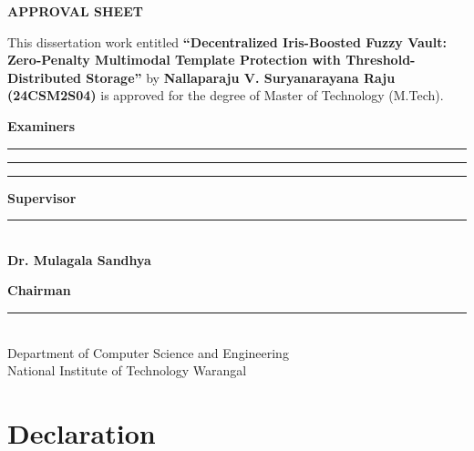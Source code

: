 \documentclass[a4paper,12pt,oneside]{book}
\begin{document}
\begin{titlepage}
\begin{center}

{\bfseries\fontsize{18}{20}\selectfont APPROVAL SHEET\par}

\vspace{1.3cm}

This dissertation work entitled {\bfseries ``Decentralized Iris-Boosted Fuzzy Vault: Zero-Penalty Multimodal Template Protection with Threshold-Distributed Storage''} by {\bfseries Nallaparaju V. Suryanarayana Raju (24CSM2S04)} is approved for the degree of Master of Technology (M.Tech).

\vspace{1.2cm}
{\bfseries Examiners}

\vspace{1.0cm}
\noindent\rule{0.55\textwidth}{0.4pt}

\vspace{1.0cm}
\noindent\rule{0.55\textwidth}{0.4pt}

\vspace{1.0cm}
\noindent\rule{0.55\textwidth}{0.4pt}

\vspace{1.5cm}
{\bfseries Supervisor}

\vspace{0.8cm}
\noindent\rule{0.55\textwidth}{0.4pt}\\[0.3cm]
{\bfseries Dr. Mulagala Sandhya}

\vspace{1.2cm}
{\bfseries Chairman}

\vspace{0.8cm}
\noindent\rule{0.55\textwidth}{0.4pt}\\[0.3cm]
Department of Computer Science and Engineering\\
National Institute of Technology Warangal

\end{center}
\end{titlepage}

\chapter*{Declaration}
\end{document}

